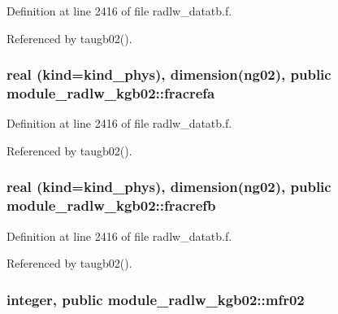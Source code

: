 Definition at line 2416 of file radlw\+\_\+datatb.\+f.



Referenced by taugb02().

\subsubsection[{\texorpdfstring{fracrefa}{fracrefa}}]{\setlength{\rightskip}{0pt plus 5cm}real (kind=kind\+\_\+phys), dimension(ng02), public module\+\_\+radlw\+\_\+kgb02\+::fracrefa}\hypertarget{namespacemodule__radlw__kgb02_af6db1580bd4a8b037cdd3e14765e2c83}{}\label{namespacemodule__radlw__kgb02_af6db1580bd4a8b037cdd3e14765e2c83}


Definition at line 2416 of file radlw\+\_\+datatb.\+f.



Referenced by taugb02().

\subsubsection[{\texorpdfstring{fracrefb}{fracrefb}}]{\setlength{\rightskip}{0pt plus 5cm}real (kind=kind\+\_\+phys), dimension(ng02), public module\+\_\+radlw\+\_\+kgb02\+::fracrefb}\hypertarget{namespacemodule__radlw__kgb02_aeedda30c8d2bd7c9e7124c6445c8c20e}{}\label{namespacemodule__radlw__kgb02_aeedda30c8d2bd7c9e7124c6445c8c20e}


Definition at line 2416 of file radlw\+\_\+datatb.\+f.



Referenced by taugb02().

\subsubsection[{\texorpdfstring{mfr02}{mfr02}}]{\setlength{\rightskip}{0pt plus 5cm}integer, public module\+\_\+radlw\+\_\+kgb02\+::mfr02}\hypertarget{namespacemodule__radlw__kgb02_a2973c2e9220e85b74f0b251c896aa837}{}\label{namespacemodule__radlw__kgb02_a2973c2e9220e85b74f0b251c896aa837}


